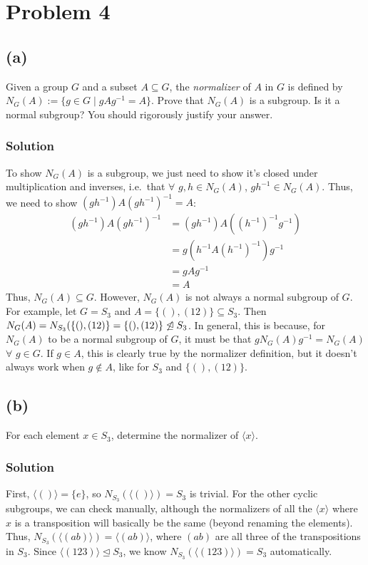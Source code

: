 \documentclass[fleqn]{article}
\begin{document}
    \section{Problem 4}
        
        \subsection{(a)}
        Given a group $G$ and a subset $A \subseteq G$, the \textit{normalizer} of $A$ in $G$ is defined by $N_G(A) := \{g \in G \mid gAg^{-1} = A\}$.  Prove that $N_G(A)$ is a subgroup.  Is it a normal subgroup?  You should rigorously justify your answer.
            
            \subsubsection{Solution}
            To show $N_G(A)$ is a subgroup, we just need to show it's closed under multiplication and inverses, i.e.\ that $\forall$ $g, h \in N_G(A)$, $gh^{-1} \in N_G(A)$.  Thus, we need to show $(gh^{-1})A(gh^{-1})^{-1} = A$:
            \begin{align}
                (gh^{-1})A(gh^{-1})^{-1} 
                    &= (gh^{-1})A\left((h^{-1})^{-1}g^{-1}\right) \\
                    &= g\left(h^{-1}A(h^{-1})^{-1}\right)g^{-1} \\
                    &= gAg^{-1} \\
                    &= A
            \end{align}
            Thus, $N_G(A) \subseteq G$.  However, $N_G(A)$ is not always a normal subgroup of $G$.  For example, let $G = S_3$ and $A = \{(), (12)\} \subseteq S_3$.  Then $N_G(A) = N_{S_3}(\{(), (12)\} = \{(), (12)\} \centernot{\unlhd} S_3$.  In general, this is because, for $N_G(A)$ to be a normal subgroup of $G$, it must be that $g N_G(A) g^{-1} = N_G(A)$ $\forall$ $g \in G$.  If $g \in A$, this is clearly true by the normalizer definition, but it doesn't always work when $g \notin A$, like for $S_3$ and $\{(), (12)\}$.
        
        \subsection{(b)}
        For each element $x \in S_3$, determine the normalizer of $\langle x \rangle$.
            
            \subsubsection{Solution}
            First, $\langle () \rangle = \{e\}$, so $N_{S_3}(\langle () \rangle) = S_3$ is trivial.  For the other cyclic subgroups, we can check manually, although the normalizers of all the $\langle x \rangle$ where $x$ is a transposition will basically be the same (beyond renaming the elements).  Thus, $N_{S_3}(\langle (ab) \rangle) = \langle (ab) \rangle$, where $(ab)$ are all three of the transpositions in $S_3$.  Since $\langle (123) \rangle \unlhd S_3$, we know $N_{S_3}(\langle (123) \rangle) = S_3$ automatically.
    
\end{document}
